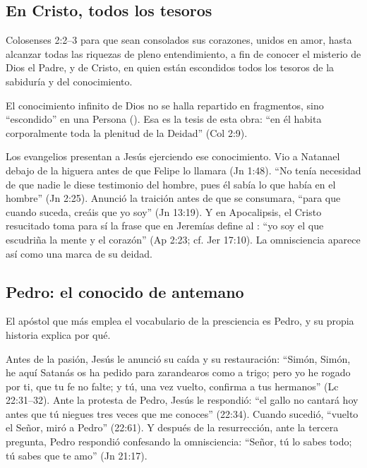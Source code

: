 \subsection{En Cristo, todos los tesoros}

\begin{verso}{Colosenses 2:2–3}
para que sean consolados sus corazones, unidos en amor, hasta alcanzar todas las riquezas de pleno entendimiento, a fin de conocer el misterio de Dios el Padre, y de Cristo, en quien están escondidos todos los tesoros de la sabiduría y del conocimiento.
\end{verso}

El conocimiento infinito de Dios no se halla repartido en fragmentos, sino ``escondido'' en una Persona (). Esa es la tesis de esta obra: ``en él habita corporalmente toda la plenitud de la Deidad'' (Col 2:9).


Los evangelios presentan a Jesús ejerciendo ese conocimiento. Vio a Natanael debajo de la higuera antes de que Felipe lo llamara (Jn 1:48). ``No tenía necesidad de que nadie le diese testimonio del hombre, pues él sabía lo que había en el hombre'' (Jn 2:25). Anunció la traición antes de que se consumara, ``para que cuando suceda, creáis que yo soy'' (Jn 13:19). Y en Apocalipsis, el Cristo resucitado toma para sí la frase que en Jeremías define al \SENOR{}: ``yo soy el que escudriña la mente y el corazón'' (Ap 2:23; cf. Jer 17:10). La omnisciencia aparece así como una marca de su deidad.


\subsection{Pedro: el conocido de antemano}
El apóstol que más emplea el vocabulario de la presciencia es Pedro, y su propia historia explica por qué.

Antes de la pasión, Jesús le anunció su caída y su restauración: ``Simón, Simón, he aquí Satanás os ha pedido para zarandearos como a trigo; pero yo he rogado por ti, que tu fe no falte; y tú, una vez vuelto, confirma a tus hermanos'' (Lc 22:31--32). Ante la protesta de Pedro, Jesús le respondió: ``el gallo no cantará hoy antes que tú niegues tres veces que me conoces'' (22:34). Cuando sucedió, ``vuelto el Señor, miró a Pedro'' (22:61). Y después de la resurrección, ante la tercera pregunta, Pedro respondió confesando la omnisciencia: ``Señor, tú lo sabes todo; tú sabes que te amo'' (Jn 21:17).

